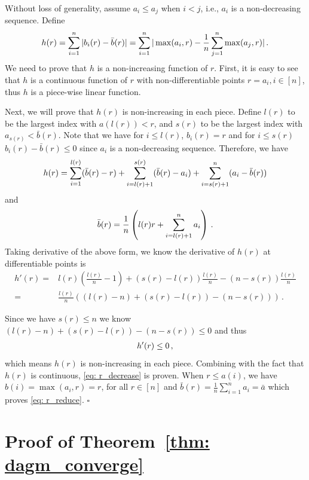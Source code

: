 \documentclass[11pt]{article}
\begin{document}
Without loss of generality, assume $a_i \leq a_j$ when $i < j$, i.e., $a_i$ is a non-decreasing sequence. Define 
\begin{align}\notag
h(r) = \sum_{i=1}^n |b_i(r) - \bar b(r)| = \sum_{i=1}^n |\max (a_i,r) - \frac{1}{n}\sum_{j=1}^n \max(a_j,r)|\, .
\end{align}
We need to prove that $h$ is a non-increasing function of $r$. 
First,
it is easy to see that $h$ is a continuous function of $r$ with non-differentiable points $r = a_i, i \in [n]$, thus $h$ is a piece-wise linear function.

Next, we will prove that $h(r)$ is  non-increasing in each piece.
Define $ l(r)$ to be the largest index with $a(l(r)) < r$, and $s(r)$ to be the largest index with $a_{s(r)} < \bar b(r)$. Note that we have for $i \leq l(r)$, $b_i(r) = r$ and for $i \leq s(r)$ $b_i(r) - \bar b(r) \leq 0$ since $a_i$ is a non-decreasing sequence. 
Therefore, we have 
\begin{align}\notag
h(r) = \sum_{i=1}^{l(r)} (\bar b(r) - r) + \sum_{i= l(r)+1} ^{s(r) } (\bar b(r) - a_i) + \sum_{i= s(r)+1}^n (a_i - \bar b(r))
\end{align}
and 
\begin{align}\notag
\bar b(r) = \frac{1}{n}\left (l(r) r + \sum_{i=l(r)+1}^n a_i\right) \, .
\end{align}
Taking derivative of the above form, we know the derivative of $h(r)$ at differentiable points is
\begin{align}
h'(r) = &l(r) (\frac{l(r)}{n}-1) + (s(r)-l(r)) \frac{l(r)}{n} - (n-s(r)) \frac{l(r)}{n} \nonumber \\
= & \frac{l(r)}{n} ((l(r) - n) + (s(r) - l(r)) - (n-s(r))) \, . \nonumber
\end{align}

Since we have $s(r) \leq n$ we know $(l(r) - n) + (s(r) - l(r)) - (n-s(r)) \leq 0$ and thus
\begin{align}\notag
h'(r) \leq 0 \, ,
\end{align}
which means $h(r)$ is non-increasing in each piece. Combining with the fact that $h(r)$ is continuous, \eqref{eq: r_decrease} is proven.
When $r \leq a(i)$, we have $b(i) = \max(a_i,r) = r$, for all $r \in [n]$ and $\bar b(r) = \frac{1}{n}\sum_{i=1}^n a_i = \bar a$ which proves \eqref{eq: r_reduce}.
\hfill $\square$


\clearpage

\section{Proof of Theorem~\ref{thm: dagm_converge}}\label{app: proof_thm_adm}
\end{document}
